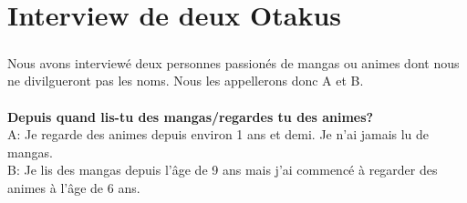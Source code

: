 \chapter{Interview de deux Otakus}

\paragraph{} Nous avons interviewé deux personnes passionés de mangas ou animes
dont nous ne divilgueront pas les noms. Nous les appellerons donc A et B.\\
\\

\textbf{Depuis quand lis-tu des mangas/regardes tu des animes?}\\
A: Je regarde des animes depuis environ 1 ans et demi. Je n'ai jamais lu de
mangas.\\
B: Je lis des mangas depuis l'âge de 9 ans mais j'ai commencé à regarder des
animes à l'âge de 6 ans.\\

